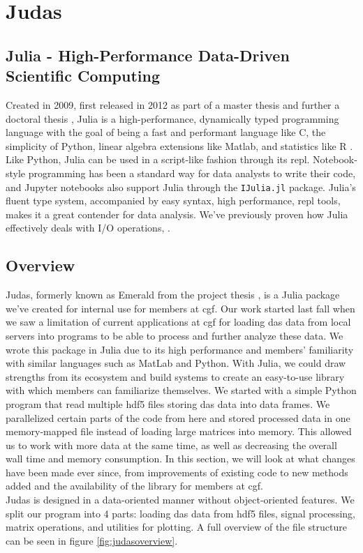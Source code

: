 \section{Judas}
\label{met:Judas}

\subsection{Julia - High-Performance Data-Driven Scientific Computing}
\label{met:Julia}

Created in 2009, first released in 2012 as part of a master thesis \cite{juliaMs} and further a doctoral thesis \cite{juliaPHD}, Julia is a high-performance, dynamically typed programming language with the goal of being a fast and performant language like C, the simplicity of Python, linear algebra extensions like Matlab, and statistics like R \cite{julia}. Like Python, Julia can be used in a script-like fashion through its \acrfull{repl}. Notebook-style programming has been a standard way for data analysts to write their code, and Jupyter notebooks also support Julia through the \texttt{IJulia.jl} package. 
Julia's fluent type system, accompanied by easy syntax, high performance, \acrshort{repl} tools, makes it a great contender for data analysis. We've previously proven how Julia effectively deals with I/O operations, \cite{projthesis}.

\subsection{Overview}
\label{met:judasoverview}

Judas, formerly known as Emerald from the project thesis \cite{projthesis}, is a Julia package we've created for internal use for members at \acrshort{cgf}. Our work started last fall when we saw a limitation of current applications at \acrshort{cgf} for loading \acrshort{das} data from local servers into programs to be able to process and further analyze these data. We wrote this package in Julia due to its high performance and members' familiarity with similar languages such as MatLab and Python. With Julia, we could draw strengths from its ecosystem and build systems to create an easy-to-use library with which members can familiarize themselves. We started with a simple Python program that read multiple \acrshort{hdf5} files storing \acrshort{das} data into data frames. We parallelized certain parts of the code from here and stored processed data in one memory-mapped file instead of loading large matrices into memory. This allowed us to work with more data at the same time, as well as decreasing the overall wall time and memory consumption.  
In this section, we will look at what changes have been made ever since, from improvements of existing code to new methods added and the availability of the library for members at \acrshort{cgf}. \\
Judas is designed in a data-oriented manner without object-oriented features. We split our program into 4 parts: loading \acrshort{das} data from \acrshort{hdf5} files, signal processing, matrix operations, and utilities for plotting. A full overview of the file structure can be seen in figure \ref{fig:judasoverview}.\\

